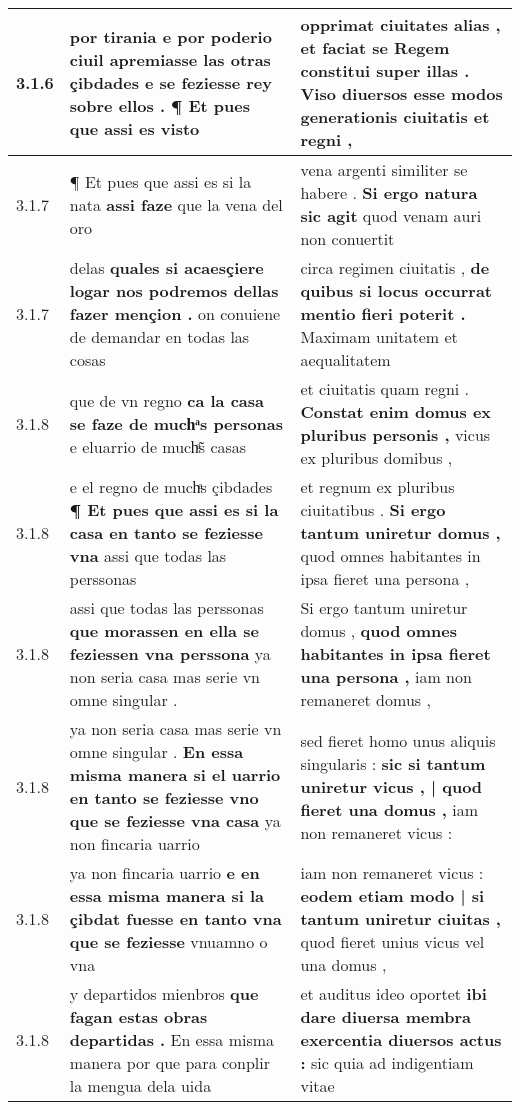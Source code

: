 \begin{tabular}{|p{1cm}|p{6.5cm}|p{6.5cm}|}
3.1.6 & por tirania e por poderio ciuil apremiasse las otras çibdades \textbf{ e se feziesse rey sobre ellos . } ¶ Et pues que assi es visto & opprimat ciuitates alias , \textbf{ et faciat se Regem constitui super illas . } Viso diuersos esse modos generationis ciuitatis et regni , \\\hline
3.1.7 & ¶ Et pues que assi es si la nata \textbf{ assi faze } que la vena del oro & vena argenti similiter se habere . \textbf{ Si ergo natura sic agit } quod venam auri non conuertit \\\hline
3.1.7 & delas \textbf{ quales si acaesçiere logar nos podremos dellas fazer mençion . } on conuiene de demandar en todas las cosas & circa regimen ciuitatis , \textbf{ de quibus si locus occurrat mentio fieri poterit . } Maximam unitatem et aequalitatem \\\hline
3.1.8 & que de vn regno \textbf{ ca la casa se faze de muchͣs personas } e eluarrio de muchͣ̃s casas & et ciuitatis quam regni . \textbf{ Constat enim domus ex pluribus personis , } vicus ex pluribus domibus , \\\hline
3.1.8 & e el regno de muchͣs çibdades \textbf{ ¶ Et pues que assi es si la casa en tanto se feziesse vna } assi que todas las perssonas & et regnum ex pluribus ciuitatibus . \textbf{ Si ergo tantum uniretur domus , } quod omnes habitantes in ipsa fieret una persona , \\\hline
3.1.8 & assi que todas las perssonas \textbf{ que morassen en ella se feziessen vna perssona } ya non seria casa mas serie vn omne singular . & Si ergo tantum uniretur domus , \textbf{ quod omnes habitantes in ipsa fieret una persona , } iam non remaneret domus , \\\hline
3.1.8 & ya non seria casa mas serie vn omne singular . \textbf{ En essa misma manera si el uarrio en tanto se feziesse vno que se feziesse vna casa } ya non fincaria uarrio & sed fieret homo unus aliquis singularis : \textbf{ sic si tantum uniretur vicus , | quod fieret una domus , } iam non remaneret vicus : \\\hline
3.1.8 & ya non fincaria uarrio \textbf{ e en essa misma manera si la çibdat fuesse en tanto vna que se feziesse } vnuamno o vna & iam non remaneret vicus : \textbf{ eodem etiam modo | si tantum uniretur ciuitas , } quod fieret unius vicus vel una domus , \\\hline
3.1.8 & y departidos mienbros \textbf{ que fagan estas obras departidas . } En essa misma manera por que para conplir la mengua dela uida & et auditus ideo oportet \textbf{ ibi dare diuersa membra exercentia diuersos actus : } sic quia ad indigentiam vitae \\\hline

\end{tabular}
